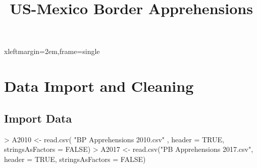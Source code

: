 \documentclass[letterpaper]{article}
\begin{document}
 {xleftmargin=2em,frame=single}


\title{US-Mexico Border Apprehensions}
\maketitle

\section{Data Import and Cleaning}

\subsection{Import Data}
\begin{Schunk}
\begin{Sinput}
> A2010 <- read.csv( "BP Apprehensions 2010.csv" , header = TRUE, stringsAsFactors = FALSE)
> A2017 <- read.csv("PB Apprehensions 2017.csv", header = TRUE, stringsAsFactors = FALSE)
\end{Sinput}
\end{Schunk}
\end{document}
